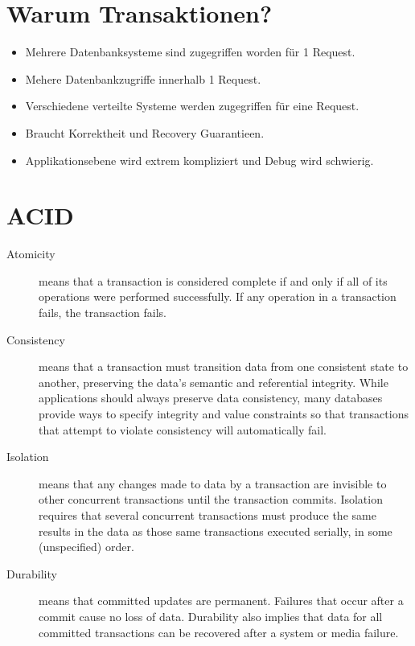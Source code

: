 \documentclass[a4paper,10pt]{scrreprt}
\begin{document}
\section{Warum Transaktionen?}
\begin{itemize}
 \item Mehrere Datenbanksysteme sind zugegriffen worden für 1 Request.
  \item Mehere Datenbankzugriffe innerhalb 1 Request.
  \item Verschiedene verteilte Systeme werden zugegriffen für eine Request.
\end{itemize}

\begin{framed}
 \begin{itemize}
  \item Braucht Korrektheit und Recovery Guarantieen.
  \item Applikationsebene wird extrem kompliziert und Debug wird schwierig.
 \end{itemize}

\end{framed}

\section{ACID}
\begin{description}
  
\item[Atomicity] means that a transaction is considered complete if and only if all of
its operations were performed successfully. If any operation in a transaction
fails, the transaction fails.
\item[Consistency] means that a transaction must transition data from one
   consistent state to another, preserving the data's semantic and referential
  integrity. While applications should always preserve data consistency, many
 databases provide ways to specify integrity and value constraints so that
transactions that attempt to violate consistency will automatically fail.
\item[Isolation] means that any changes made to data by a transaction are invisible
   to other concurrent transactions until the transaction commits. Isolation
  requires that several concurrent transactions must produce the same results
 in the data as those same transactions executed serially, in some
(unspecified) order.
\item[Durability] means that committed updates are permanent. Failures that occur
   after a commit cause no loss of data. Durability also implies that data for all
  committed transactions can be recovered after a system or media failure.

\end{description}
\end{document}

